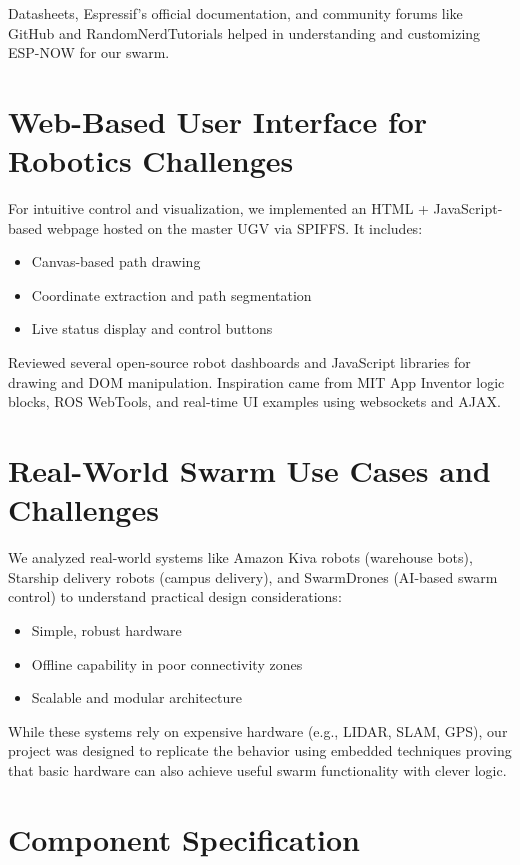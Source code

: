 \documentclass[a4paper,12pt]{report}
\begin{document}
Datasheets, Espressif's official documentation, and community forums like GitHub and RandomNerdTutorials helped in understanding and customizing ESP-NOW for our swarm.

\section{Web-Based User Interface for Robotics Challenges}
For intuitive control and visualization, we implemented an HTML + JavaScript-based webpage hosted on the master UGV via SPIFFS. It includes:
\begin{itemize}
    \item Canvas-based path drawing
    \item Coordinate extraction and path segmentation
    \item Live status display and control buttons
\end{itemize}

Reviewed several open-source robot dashboards and JavaScript libraries for drawing and DOM manipulation. Inspiration came from MIT App Inventor logic blocks, ROS WebTools, and real-time UI examples using websockets and AJAX.

\section{Real-World Swarm Use Cases and Challenges}
We analyzed real-world systems like Amazon Kiva robots (warehouse bots), Starship delivery robots (campus delivery), and SwarmDrones (AI-based swarm control) to understand practical design considerations:
\begin{itemize}
    \item Simple, robust hardware
    \item Offline capability in poor connectivity zones
    \item Scalable and modular architecture
\end{itemize}

While these systems rely on expensive hardware (e.g., LIDAR, SLAM, GPS), our project was designed to replicate the behavior using embedded techniques proving that basic hardware can also achieve useful swarm functionality with clever logic.





\section{Component Specification}
\end{document}

